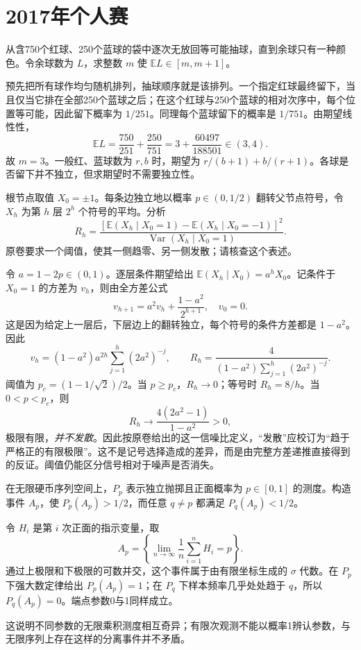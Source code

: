 \documentclass[UTF8,12pt,a4paper,fontset=fandol]{ctexbook}
\newcommand{\E}{\mathbb E}
\DeclareMathOperator{\Var}{Var}
\begin{document}
\section{2017年个人赛}
\begin{example}[原题1：抽去球直到仅余一种颜色]\label{yau:2017-1}
从含750个红球、250个蓝球的袋中逐次无放回等可能抽球，直到余球只有一种颜色。令余球数为 $L$，求整数 $m$ 使 $\E L\in[m,m+1]$。
\end{example}
\begin{solve}
预先把所有球作均匀随机排列，抽球顺序就是该排列。一个指定红球最终留下，当且仅当它排在全部250个蓝球之后；在这个红球与250个蓝球的相对次序中，每个位置等可能，因此留下概率为 $1/251$。同理每个蓝球留下的概率是 $1/751$。由期望线性性，
\[
\E L=\frac{750}{251}+\frac{250}{751}=3+\frac{60497}{188501}\in(3,4).
\]
故 $m=3$。一般红、蓝球数为 $r,b$ 时，期望为 $r/(b+1)+b/(r+1)$。各球是否留下并不独立，但求期望时不需要独立性。
\end{solve}

\begin{example}[原题2：二叉树信号传播的阈值辨析]\label{yau:2017-2}
根节点取值 $X_0=\pm1$。每条边独立地以概率 $p\in(0,1/2)$ 翻转父节点符号，令 $X_h$ 为第 $h$ 层 $2^h$ 个符号的平均。分析
\[
R_h=\frac{[\E(X_h\mid X_0=1)-\E(X_h\mid X_0=-1)]^2}{\Var(X_h\mid X_0=1)}.
\]
原卷要求一个阈值，使其一侧趋零、另一侧发散；请核查这个表述。
\end{example}
\begin{solve}
令 $a=1-2p\in(0,1)$。逐层条件期望给出 $\E(X_h\mid X_0)=a^hX_0$。记条件于 $X_0=1$ 的方差为 $v_h$，则由全方差公式
\[
v_{h+1}=a^2v_h+\frac{1-a^2}{2^{h+1}},\quad v_0=0.
\]
这是因为给定上一层后，下层边上的翻转独立，每个符号的条件方差都是 $1-a^2$。因此
\[
v_h=(1-a^2)a^{2h}\sum_{j=1}^h(2a^2)^{-j},\qquad
R_h=\frac4{(1-a^2)\sum_{j=1}^h(2a^2)^{-j}}.
\]
阈值为 $p_c=(1-1/\sqrt2)/2$。当 $p\ge p_c$，$R_h\to0$；等号时 $R_h=8/h$。当 $0<p<p_c$，则
\[
R_h\longrightarrow\frac{4(2a^2-1)}{1-a^2}>0,
\]
极限有限，\emph{并不发散}。因此按原卷给出的这一信噪比定义，“发散”应校订为“趋于严格正的有限极限”。这不是记号选择造成的差异，而是由完整方差递推直接得到的反证。阈值仍能区分信号相对于噪声是否消失。
\end{solve}

\begin{example}[原题3：不同硬币参数的无限序列测度]\label{yau:2017-3}
在无限硬币序列空间上，$P_p$ 表示独立抛掷且正面概率为 $p\in[0,1]$ 的测度。构造事件 $A_p$，使 $P_p(A_p)>1/2$，而任意 $q\ne p$ 都满足 $P_q(A_p)<1/2$。
\end{example}
\begin{solve}
令 $H_i$ 是第 $i$ 次正面的指示变量，取
\[
A_p=\left\{\lim_{n\to\infty}\frac1n\sum_{i=1}^nH_i=p\right\}.
\]
通过上极限和下极限的可数并交，这个事件属于由有限坐标生成的 $\sigma$ 代数。在 $P_p$ 下强大数定律给出 $P_p(A_p)=1$；在 $P_q$ 下样本频率几乎处处趋于 $q$，所以 $P_q(A_p)=0$。端点参数0与1同样成立。

这说明不同参数的无限乘积测度相互奇异；有限次观测不能以概率1辨认参数，与无限序列上存在这样的分离事件并不矛盾。
\end{solve}
\end{document}
